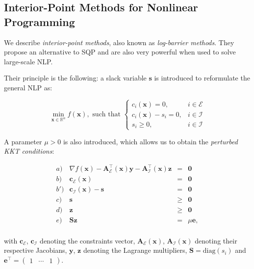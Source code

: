 \subsection{Interior-Point Methods for Nonlinear Programming}

We describe \emph{interior-point methods}, also known as
\emph{log-barrier methods}. They propose an alternative to SQP and are
also very powerful when used to solve large-scale NLP.

Their principle is the following: a slack variable $\mathbf{s}$ is
introduced to reformulate the general NLP as:

\begin{equation}
\label{eq:chap3-nlp-slack}
\min_{\mathbf{x} \in \mathbb R^n}
f(\mathbf{x}),\text{ such that }
\left\{\begin{array}{cc}
c_i(\mathbf{x}) = 0, & i \in \mathcal{E} \\%
c_i(\mathbf{x})-s_i = 0, & i \in \mathcal{I} \\%
s_i \ge 0, & i \in \mathcal{I} %
\end{array}\right.
\end{equation}

A parameter $\mu>0$ is also introduced, which allows us to obtain the
\emph{perturbed KKT conditions}:

\begin{equation}
\label{eq:chap3-kkt-perturbed}
\begin{array}{crcl}
a) & \nabla f(\mathbf{x}) - \mathbf{A}_\mathcal{E}^{\top}(\mathbf{x})\mathbf{y} - \mathbf{A}_\mathcal{I}^{\top}(\mathbf{x})\mathbf{z} & = & \mathbf{0} \\%
b) & \mathbf{c}_{\mathcal{E}}(\mathbf{x}) & = & \mathbf{0} \\%
b')& \mathbf{c}_{\mathcal{I}}(\mathbf{x}) - \mathbf{s}& = & \mathbf{0} \\%
c) & \mathbf{s} & \ge & \mathbf{0} \\%
d) & \mathbf{z} & \ge & \mathbf{0} \\%
e) & \mathbf{S}\mathbf{z} & = & \mu\mathbf{e}, \\%
\end{array}
\end{equation}

\noindent with $\mathbf{c}_{\mathcal{E}}$, $\mathbf{c}_{\mathcal{I}}$ denoting
the constraints vector, $\mathbf{A}_\mathcal{E}(\mathbf{x})$,
$\mathbf{A}_\mathcal{I}(\mathbf{x})$ denoting their respective
Jacobians, $\mathbf{y}$, $\mathbf{z}$ denoting the Lagrange
multipliers, $\mathbf{S}=\text{diag}(s_i)$ and
$\mathbf{e}^\top=\left(\begin{matrix}1&\cdots&1\end{matrix}\right)$.

